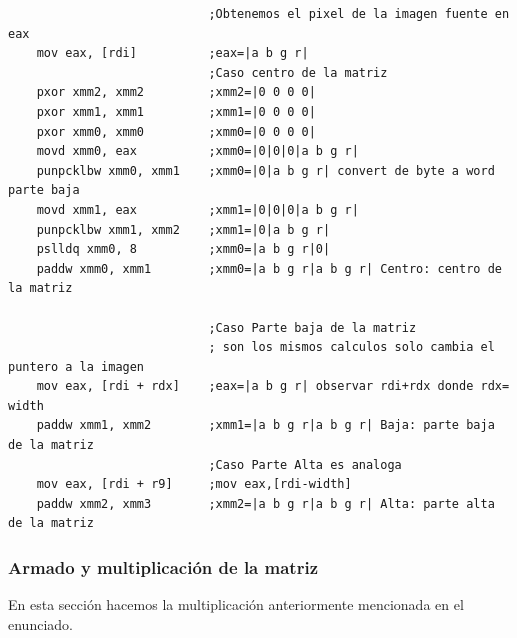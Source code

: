 \begin{codesnippet}
\begin{verbatim}    
							;Obtenemos el pixel de la imagen fuente en eax
    mov eax, [rdi]          ;eax=|a b g r|
                            ;Caso centro de la matriz
    pxor xmm2, xmm2         ;xmm2=|0 0 0 0|
    pxor xmm1, xmm1         ;xmm1=|0 0 0 0|
    pxor xmm0, xmm0         ;xmm0=|0 0 0 0|
    movd xmm0, eax          ;xmm0=|0|0|0|a b g r|
    punpcklbw xmm0, xmm1    ;xmm0=|0|a b g r| convert de byte a word parte baja
    movd xmm1, eax          ;xmm1=|0|0|0|a b g r|
    punpcklbw xmm1, xmm2    ;xmm1=|0|a b g r|     
    pslldq xmm0, 8          ;xmm0=|a b g r|0|
    paddw xmm0, xmm1        ;xmm0=|a b g r|a b g r| Centro: centro de la matriz

                            ;Caso Parte baja de la matriz
                            ; son los mismos calculos solo cambia el puntero a la imagen
    mov eax, [rdi + rdx]    ;eax=|a b g r| observar rdi+rdx donde rdx= width
    paddw xmm1, xmm2        ;xmm1=|a b g r|a b g r| Baja: parte baja de la matriz
							;Caso Parte Alta es analoga
    mov eax, [rdi + r9]     ;mov eax,[rdi-width]
    paddw xmm2, xmm3        ;xmm2=|a b g r|a b g r| Alta: parte alta de la matriz	
\end{verbatim}
\end{codesnippet}

\subsubsection*{Armado y multiplicación de la matriz}

En esta sección hacemos la multiplicación anteriormente mencionada en el enunciado.

